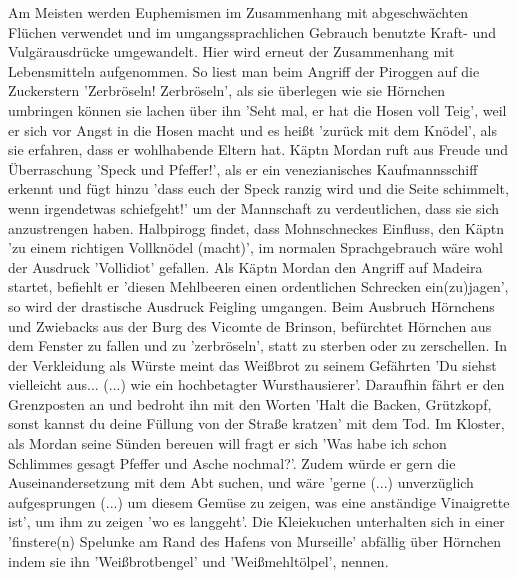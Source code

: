 Am Meisten werden Euphemismen im Zusammenhang mit abgeschwächten Flüchen verwendet und im umgangssprachlichen Gebrauch benutzte Kraft- und Vulgärausdrücke umgewandelt. Hier wird erneut der Zusammenhang mit Lebensmitteln aufgenommen. So liest man beim Angriff der Piroggen auf die Zuckerstern \cite[S.30ff]{pir}'Zerbröseln! Zerbröseln',\cite[S.33]{pir} als sie überlegen wie sie Hörnchen umbringen können\cite[S.33]{pir} sie lachen über ihn 'Seht mal, er hat die Hosen voll Teig',\cite[S.33]{pir} weil er sich vor Angst in die Hosen macht \cite[S.33]{pir} und es heißt 'zurück mit dem Knödel',\cite[S.34]{pir} als sie erfahren, dass er wohlhabende Eltern hat.\cite[S.34]{pir} Käptn Mordan ruft aus Freude und Überraschung 'Speck und Pfeffer!',\cite[S.51]{pir} als er ein venezianisches Kaufmannsschiff erkennt \cite[S.51]{pir} und fügt hinzu 'dass euch der Speck ranzig wird und die Seite schimmelt, wenn irgendetwas schiefgeht!'\cite[S.51]{pir} um der Mannschaft zu verdeutlichen, dass sie sich anzustrengen haben. Halbpirogg findet, dass Mohnschneckes Einfluss, den Käptn 'zu einem richtigen Vollknödel (macht)',\cite[S.145]{pir} im normalen Sprachgebrauch wäre wohl der Ausdruck 'Vollidiot' gefallen. Als Käptn Mordan den Angriff auf Madeira startet, befiehlt er 'diesen Mehlbeeren einen ordentlichen Schrecken ein(zu)jagen'\cite[S.188]{pir}, so wird der drastische Ausdruck Feigling umgangen. Beim Ausbruch Hörnchens und Zwiebacks aus der Burg des Vicomte de Brinson, \cite[S.240]{pir} befürchtet Hörnchen aus dem Fenster zu fallen und zu 'zerbröseln',\cite[S.240]{pir} statt zu sterben oder zu zerschellen. In der Verkleidung als Würste \cite[S.286]{pir} meint das Weißbrot zu seinem Gefährten 'Du siehst vielleicht aus... (...) wie ein hochbetagter Wursthausierer'.\cite[S.287]{pir} Daraufhin fährt er den Grenzposten an \cite[S.287]{pir} und bedroht ihn mit den Worten 'Halt die Backen, Grützkopf, sonst kannst du deine Füllung von der Straße kratzen' mit dem Tod. Im Kloster, als Mordan seine Sünden bereuen will fragt er sich 'Was habe ich schon Schlimmes gesagt Pfeffer und Asche nochmal?'. \cite[S.468]{pir} Zudem würde er gern die Auseinandersetzung mit dem Abt suchen, \cite[S.468]{pir} und wäre 'gerne (...) unverzüglich aufgesprungen  (...) um diesem Gemüse zu zeigen, was eine anständige Vinaigrette ist',\cite[S.468]{pir} um ihm zu zeigen 'wo es langgeht'. Die Kleiekuchen unterhalten sich in einer 'finstere(n) Spelunke am Rand des Hafens von Murseille'\cite[S.535f]{pir} abfällig über Hörnchen indem sie ihn 'Weißbrotbengel' \cite[S.537]{pir} und 'Weißmehltölpel',\cite[S.537]{pir} nennen.

